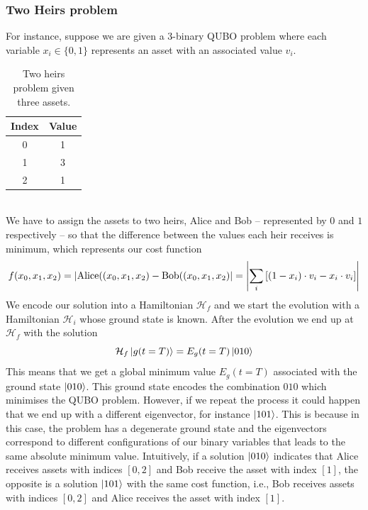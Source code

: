 \subsubsection{Two Heirs problem}
For instance, suppose we are given a 3-binary QUBO problem where each variable $x_{i} \in \{0,1\}$ represents an asset with an associated value $v_{i}$.
\begin{table}[h]
\label{tab:Assets}
\centering
\begin{tabular}{ c | c }
  \hline			
  Index & Value  \\
    \hline		
   0 & 1\\
       \hline		
   1 & 3\\
       \hline		
   2 & 1
\end{tabular}
\caption{Two heirs problem given three assets.}
\end{table}
\\
We have to assign the assets to two heirs, Alice and Bob -- represented by $0$ and $1$ respectively -- so that the difference between the values each heir receives is minimum, which represents our cost function
\begin{equation}
    f(x_{0}, x_{1}, x_{2}) = \abs{\text{Alice}((x_{0}, x_{1}, x_{2}) - \text{Bob}((x_{0}, x_{1}, x_{2})} = \abs{\sum_{i}\left[(1-x_{i})\cdot v_{i} - x_{i}\cdot v_{i}\right]}
\end{equation}
We encode our solution into a Hamiltonian $\mathcal{H}_{f}$ and we start the evolution with a Hamiltonian $\mathcal{H}_{i}$ whose ground state is known. After the evolution we end up at $\mathcal{H}_{f}$ with the solution
\begin{equation}
    \mathcal{H}_{f}\ket{g(t=T)} = E_{g}(t=T)\ket{010}
\end{equation}
This means that we get a global minimum value $E_{g}(t=T)$ associated with the ground state $\ket{010}$. This ground state encodes the combination $010$ which minimises the QUBO problem. However, if we repeat the process it could happen that we end up with a different eigenvector, for instance $\ket{101}$. This is because in this case, the problem has a degenerate ground state and the eigenvectors correspond to different configurations of our binary variables that leads to the same absolute minimum value. Intuitively, if a solution $\ket{010}$ indicates that Alice receives assets with indices $[0,2]$ and Bob receive the asset with index $[1]$, the opposite is a solution $\ket{101}$ with the same cost function, i.e., Bob receives assets with indices $[0,2]$ and Alice receives the asset with index $[1]$.
